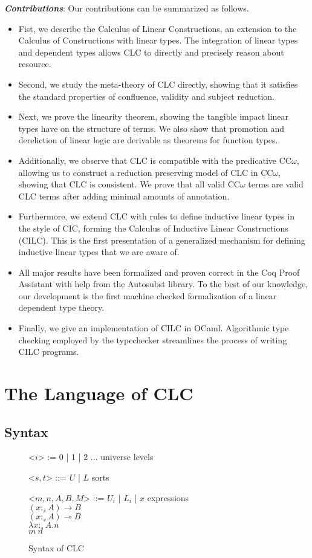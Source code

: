 \documentclass[sigplan,screen,review,anonymous]{acmart}
\newcommand{\indalt}[1][2]{\\\hspace*{-1.2em}\textbar\quad}
\begin{document}
\noindent \textbf{\textit{Contributions}}:
Our contributions can be summarized as follows.
\begin{itemize}
  \item Fist, we describe the Calculus of Linear Constructions, an extension to the Calculus of Constructions with linear types. The integration of linear types and dependent types allows CLC to directly and precisely reason about resource.
  \item Second, we study the meta-theory of CLC directly, showing that it satisfies the standard properties of confluence, validity and subject reduction.
  \item Next, we prove the linearity theorem, showing the tangible impact linear types have on the structure of terms. We also show that promotion and dereliction of linear logic are derivable as theorems for function types.
  \item Additionally, we observe that CLC is compatible with the predicative CC$\omega$, allowing us to construct a reduction preserving model of CLC in CC$\omega$, showing that CLC is consistent. We prove that all valid CC$\omega$ terms are valid CLC terms after adding minimal amounts of annotation.
  \item Furthermore, we extend CLC with rules to define inductive linear types in the style of CIC, forming the Calculus of Inductive Linear Constructions (CILC). This is the first presentation of a generalized mechanism for defining inductive linear types that we are aware of.
  \item All major results have been formalized and proven correct in the Coq Proof Assistant with help from the Autosubst \cite{autosubst} library. To the best of our knowledge, our development is the first machine checked formalization of a linear dependent type theory.
  \item Finally, we give an implementation of CILC in OCaml. Algorithmic type checking employed by the typechecker streamlines the process of writing CILC programs.
\end{itemize}

\section{The Language of CLC}
\subsection{Syntax}
\begin{figure}[h]
  \caption{Syntax of CLC}
  \begin{grammar}
    <$i$> := 0 | 1 | 2 ... \phantom{* |} \hspace*{3em} universe levels

    <$s, t$> ::= $U$ | $L$ \phantom{| $x$} \hspace*{4.6em} sorts

    <$m, n, A, B, M$> ::= $U_i$ | $L_i$ | $x$ \hspace*{4.2em} expressions
    \indalt $(x :_s A) \rightarrow B$
    \indalt $(x :_s A) \multimap B$
    \indalt $\lambda x :_s A. n$
    \indalt $m\ n$
  \end{grammar}
  \Description{}
  \label{syntax1}
\end{figure}
\end{document}
